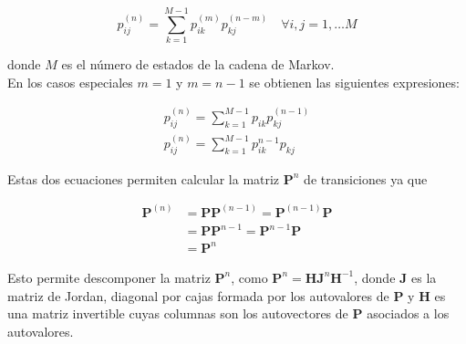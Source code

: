 \begin{equation}
p_{ij}^{(n)} = \sum\limits_{k=1}^{M-1} p_{ik}^{(m)}p_{kj}^{(n-m)} \quad \forall i,j = 1,\dots M
\end{equation}

donde $M$ es el número de estados de la cadena de Markov. \\

En los casos especiales $m=1$ y $m = n-1$ se obtienen las siguientes expresiones:

\begin{eqnarray}
p_{ij}^{(n)} = \sum\limits_{k=1}^{M-1} p_{ik}p_{kj}^{(n-1)}\\
p_{ij}^{(n)} = \sum\limits_{k=1}^{M-1} p_{ik}^{n-1}p_{kj}
\end{eqnarray}

Estas dos ecuaciones permiten calcular la matriz $\mathbf{P}^n$ de transiciones ya que 

\begin{align*}
\mathbf{P}^{(n)} & = \mathbf{P} \mathbf{P}^{(n-1)} = \mathbf{P}^{(n-1)} \mathbf{P}\\
				 & = \mathbf{P} \mathbf{P}^{n-1} = \mathbf{P}^{n-1} \mathbf{P} \\
				 & = \mathbf{P}^n 
\end{align*} 

Esto permite descomponer la matriz $\mathbf{P}^n$, como $\mathbf{P}^n = \mathbf{H} \mathbf{J}^n \mathbf{H}^{-1}$, donde $\mathbf{J}$ es la matriz de Jordan, diagonal por cajas formada por los autovalores de $\mathbf{P}$ y $\mathbf{H}$ es una matriz invertible cuyas columnas son los autovectores de $\mathbf{P}$ asociados a los autovalores.

